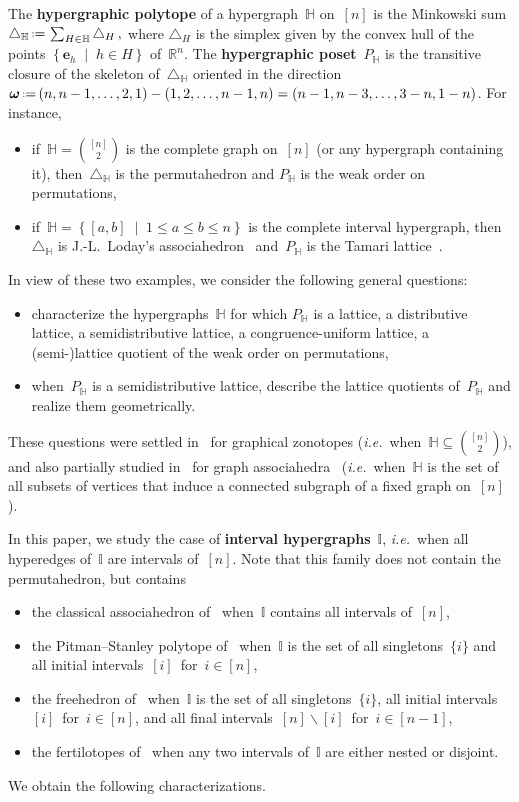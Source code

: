 \documentclass[reqno]{amsart}
\theoremstyle{definition}
\newcommand{\R}{\mathbb{R}} %
\renewcommand{\b}[1]{\boldsymbol{#1}} %
\newcommand{\set}[2]{\left\{ #1 \;\middle|\; #2 \right\}} %
\newcommand{\ssm}{\smallsetminus} %
\newcommand{\eqdef}{\mbox{\,\raisebox{0.2ex}{\scriptsize\ensuremath{\mathrm:}}\ensuremath{=}\,}} %
\newcommand{\simplex}{\triangle} %
\newcommand{\ie}{\textit{i.e.}~} %
\newcommand{\defn}[1]{\textbf{\textsf{\color{PineGreen} #1}}} %
\newcommand{\HH}{\mathbb H}  %
\newcommand{\II}{\mathbb I} %
\begin{document}
The \defn{hypergraphic polytope} of a hypergraph~$\HH$ on~$[n]$ is the Minkowski sum
\(
\simplex_\HH \eqdef \sum_{H\in \HH} \simplex_H\,,
\)
where $\simplex_H$ is the simplex given by the convex hull of the points $\set{\b{e}_h}{h \in H}$ of~$\R^n$.
The \defn{hypergraphic poset}~$P_\HH$ is the transitive closure of the skeleton of~$\simplex_\HH$ oriented in the direction~$\b{\omega} \eqdef (n, n-1, \dots, 2, 1) - (1, 2, \dots, n-1, n) = (n-1, n-3, \dots, 3-n, 1-n)$.
For instance, 
\begin{itemize}
\item if~$\HH = \binom{[n]}{2}$ is the complete graph on~$[n]$ (or any hypergraph containing it), then~$\simplex_\HH$ is the permutahedron and $P_\HH$ is the weak order on permutations,
\item if~$\HH = \set{[a,b]}{1 \le a \le b \le n}$ is the complete interval hypergraph, then~$\simplex_\HH$ is \mbox{J.-L.~Loday's} associahedron~\cite{ShniderSternberg,Loday} and~$P_\HH$ is the Tamari lattice~\cite{Tamari}.
\end{itemize}
In view of these two examples, we consider the following general questions:
\begin{itemize}
\item characterize the hypergraphs~$\HH$ for which $P_\HH$ is a lattice, a distributive lattice, a semidistributive lattice, a congruence-uniform lattice, a (semi-)lattice quotient of the weak order on permutations,
\item when~$P_\HH$ is a semidistributive lattice, describe the lattice quotients of~$P_\HH$ and realize them geometrically.
\end{itemize}
These questions were settled in~\cite{Pilaud-acyclicReorientationLattices} for graphical zonotopes (\ie when~$\HH \subseteq \binom{[n]}{2}$), and also partially studied in~\cite{BarnardMcConville} for graph associahedra~\cite{CarrDevadoss} (\ie when~$\HH$ is the set of all subsets of vertices that induce a connected subgraph of a fixed graph on~$[n]$).

In this paper, we study the case of \defn{interval hypergraphs}~$\II$, \ie when all hyperedges of~$\II$ are intervals of~$[n]$.
Note that this family does not contain the permutahedron, but contains
\begin{itemize}
\item the classical associahedron of~\cite{ShniderSternberg,Loday} when~$\II$ contains all intervals of~$[n]$,
\item the Pitman--Stanley polytope of~\cite{PitmanStanley} when~$\II$ is the set of all singletons~$\{i\}$ and all initial intervals~$[i]$~for~${i \in [n]}$,
\item the freehedron of~\cite{Saneblidze-freehedron} when~$\II$ is the set of all singletons~$\{i\}$, all initial intervals~$[i]$~for~${i \in [n]}$, and all final intervals~$[n] \ssm [i]$~for~${i \in [n-1]}$,
\item the fertilotopes of~\cite{Defant-fertilitopes} when any two intervals of~$\II$ are either nested or disjoint.
\end{itemize}
We obtain the following characterizations.
\end{document}
